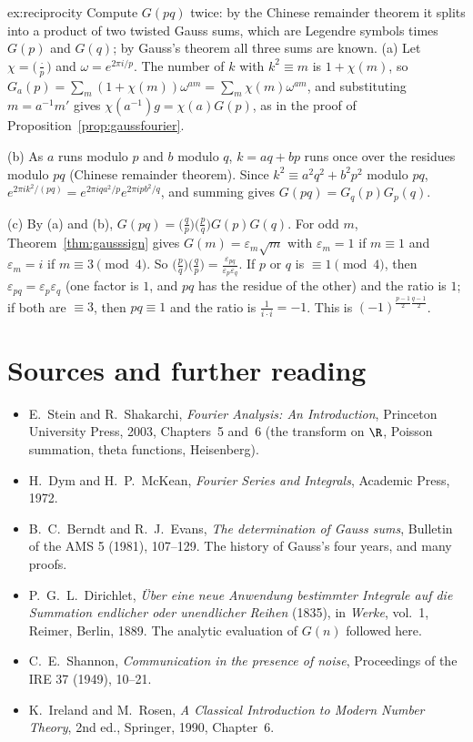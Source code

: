 \begin{solution}{ex:reciprocity}
\idea Compute $G(pq)$ twice: by the Chinese remainder theorem it splits into a product of two twisted Gauss sums, which are
Legendre symbols times $G(p)$ and $G(q)$; by Gauss's theorem all three sums are known.
\writeup (a) Let $\chi=\bigl(\frac\cdot p\bigr)$ and $\omega=e^{2\pi i/p}$. The number of $k$ with $k^2\equiv m$ is $1+\chi(m)$, so $G_a(p)=\sum_m(1+\chi(m))\omega^{am}=\sum_m\chi(m)\omega^{am}$,
and substituting $m=a^{-1}m'$ gives $\chi(a^{-1})g=\chi(a)G(p)$, as in the proof of Proposition~\ref{prop:gaussfourier}.

(b) As $a$ runs modulo $p$ and $b$ modulo $q$, $k=aq+bp$ runs once over the residues modulo $pq$ (Chinese remainder theorem). Since $k^2\equiv a^2q^2+b^2p^2$
modulo $pq$, $e^{2\pi ik^2/(pq)}=e^{2\pi iqa^2/p}e^{2\pi ipb^2/q}$, and summing gives $G(pq)=G_q(p)G_p(q)$.

(c) By (a) and (b), $G(pq)=\bigl(\frac qp\bigr)\bigl(\frac pq\bigr)G(p)G(q)$. For odd $m$, Theorem~\ref{thm:gausssign} gives $G(m)=\varepsilon_m\sqrt m$ with $\varepsilon_m=1$ if $m\equiv1$ and $\varepsilon_m=i$ if
$m\equiv3\pmod4$. So $\bigl(\frac pq\bigr)\bigl(\frac qp\bigr)=\frac{\varepsilon_{pq}}{\varepsilon_p\varepsilon_q}$. If $p$ or $q$ is $\equiv1\pmod4$, then $\varepsilon_{pq}=\varepsilon_p\varepsilon_q$ (one factor is $1$, and $pq$ has the
residue of the other) and the ratio is $1$; if both are $\equiv3$, then $pq\equiv1$ and the ratio is $\frac1{i\cdot i}=-1$. This is $(-1)^{\frac{p-1}2\frac{q-1}2}$.
\end{solution}

\section*{Sources and further reading}

\begin{itemize}
\item E.~Stein and R.~Shakarchi, \emph{Fourier Analysis: An Introduction}, Princeton University Press, 2003, Chapters~5
and~6 (the transform on $\R$, Poisson summation, theta functions, Heisenberg).
\item H.~Dym and H.~P.~McKean, \emph{Fourier Series and Integrals}, Academic Press, 1972.
\item B.~C.~Berndt and R.~J.~Evans, \emph{The determination of Gauss sums}, Bulletin of the AMS 5 (1981), 107--129. The
history of Gauss's four years, and many proofs.
\item P.~G.~L.~Dirichlet, \emph{\"Uber eine neue Anwendung bestimmter Integrale auf die Summation endlicher oder unendlicher
Reihen} (1835), in \emph{Werke}, vol.~1, Reimer, Berlin, 1889. The analytic evaluation of $G(n)$ followed here.
\item C.~E.~Shannon, \emph{Communication in the presence of noise}, Proceedings of the IRE 37 (1949), 10--21.
\item K.~Ireland and M.~Rosen, \emph{A Classical Introduction to Modern Number Theory}, 2nd ed., Springer, 1990, Chapter~6.
\end{itemize}
